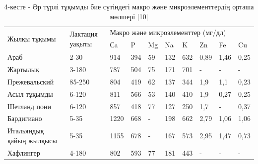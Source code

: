 \begin{table}[H]
\caption*{4-кесте - Әр түрлі тұқымды бие сүтіндегі макро және микроэлементтердің орташа мөлшері {[}10{]}}
\centering
\begin{tabular}{|l|p{}|llllllll|}
\hline
\multirow{2}{*}{Жылқы тұқымы} & \multirow{2}{=}{Лактация уақыты} & \multicolumn{8}{l|}{Макро және микроэлементтер (мг/дл)} \\ \cline{3-10}
 &  & \multicolumn{1}{l|}{Сa} & \multicolumn{1}{l|}{P} & \multicolumn{1}{l|}{Mg} & \multicolumn{1}{l|}{Na} & \multicolumn{1}{l|}{K} & \multicolumn{1}{l|}{Zn} & \multicolumn{1}{l|}{Fe} & Cu \\ \hline
Араб & 2-30 & \multicolumn{1}{l|}{914} & \multicolumn{1}{l|}{394} & \multicolumn{1}{l|}{59} & \multicolumn{1}{l|}{132} & \multicolumn{1}{l|}{632} & \multicolumn{1}{l|}{0,89} & \multicolumn{1}{l|}{1,46} & 0,25 \\ \hline
Жартылық & 3-180 & \multicolumn{1}{l|}{787} & \multicolumn{1}{l|}{504} & \multicolumn{1}{l|}{75} & \multicolumn{1}{l|}{171} & \multicolumn{1}{l|}{701} & \multicolumn{1}{l|}{-} & \multicolumn{1}{l|}{-} & - \\ \hline
Прежевальский & 85-250 & \multicolumn{1}{l|}{804} & \multicolumn{1}{l|}{419} & \multicolumn{1}{l|}{62} & \multicolumn{1}{l|}{137} & \multicolumn{1}{l|}{344} & \multicolumn{1}{l|}{1,9} & \multicolumn{1}{l|}{1,1} & 0,23 \\ \hline
Асыл тұқымды & 6-120 & \multicolumn{1}{l|}{811} & \multicolumn{1}{l|}{566} & \multicolumn{1}{l|}{53} & \multicolumn{1}{l|}{140} & \multicolumn{1}{l|}{410} & \multicolumn{1}{l|}{1,9} & \multicolumn{1}{l|}{0,27} & 0,25 \\ \hline
Шетланд пони & 6-120 & \multicolumn{1}{l|}{857} & \multicolumn{1}{l|}{418} & \multicolumn{1}{l|}{77} & \multicolumn{1}{l|}{127} & \multicolumn{1}{l|}{250} & \multicolumn{1}{l|}{1,7} & \multicolumn{1}{l|}{-} & 0,37 \\ \hline
Бардигиано & 5-35 & \multicolumn{1}{l|}{1220} & \multicolumn{1}{l|}{668} & \multicolumn{1}{l|}{-} & \multicolumn{1}{l|}{198} & \multicolumn{1}{l|}{662} & \multicolumn{1}{l|}{2,79} & \multicolumn{1}{l|}{1,06} & 1,06 \\ \hline
Итальяндық қайың жылқысы & 5-35 & \multicolumn{1}{l|}{1155} & \multicolumn{1}{l|}{678} & \multicolumn{1}{l|}{-} & \multicolumn{1}{l|}{167} & \multicolumn{1}{l|}{573} & \multicolumn{1}{l|}{2,95} & \multicolumn{1}{l|}{1,47} & 0,73 \\ \hline
Хафлингер & 4-180 & \multicolumn{1}{l|}{802} & \multicolumn{1}{l|}{593} & \multicolumn{1}{l|}{77} & \multicolumn{1}{l|}{181} & \multicolumn{1}{l|}{443} & \multicolumn{1}{l|}{-} & \multicolumn{1}{l|}{-} & - \\ \hline
\end{tabular}
\end{table}

